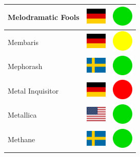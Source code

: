 \documentclass[12pt, a4paper, twoside]{report}
\begin{document}
\begin{center}
\begin{longtable}{|p{5cm}|p{2cm}|p{2cm}|}
 Melodramatic Fools                                         & \includegraphics[width=1cm]{4x3/de} &   \includegraphics[width=1cm]{likes/y} \\ \hline
 Membaris                                                   & \includegraphics[width=1cm]{4x3/de} &   \includegraphics[width=1cm]{likes/m} \\ \hline
 Mephorash                                                  & \includegraphics[width=1cm]{4x3/se} &   \includegraphics[width=1cm]{likes/y} \\ \hline
 Metal Inquisitor                                           & \includegraphics[width=1cm]{4x3/de} &   \includegraphics[width=1cm]{likes/n} \\ \hline
 Metallica                                                  & \includegraphics[width=1cm]{4x3/us} &   \includegraphics[width=1cm]{likes/y} \\ \hline
 Methane                                                    & \includegraphics[width=1cm]{4x3/se} &   \includegraphics[width=1cm]{likes/y} \\ \hline

\end{longtable}
\end{center}
\end{document}
